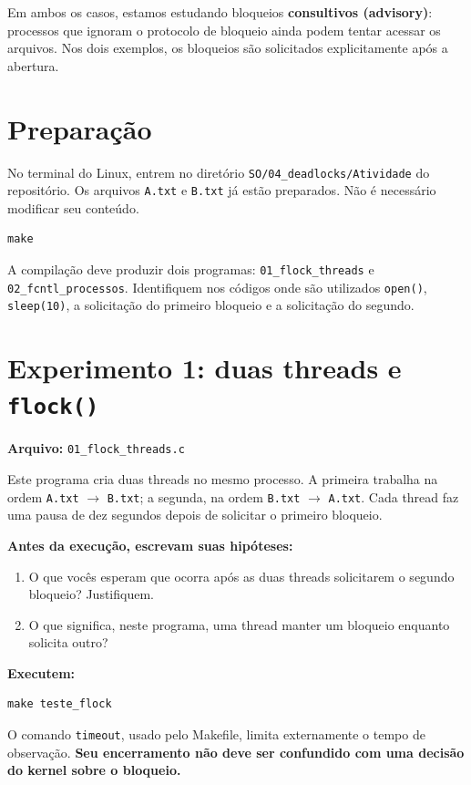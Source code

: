 \documentclass[11pt,a4paper]{article}
\begin{document}
Em ambos os casos, estamos estudando bloqueios \textbf{consultivos (advisory)}: processos que ignoram o protocolo de bloqueio ainda podem tentar acessar os arquivos. Nos dois exemplos, os bloqueios são solicitados explicitamente após a abertura.

\section{Preparação}
No terminal do Linux, entrem no diretório \texttt{SO/04\_deadlocks/Atividade} do repositório. Os arquivos \texttt{A.txt} e \texttt{B.txt} já estão preparados. Não é necessário modificar seu conteúdo.
\begin{lstlisting}[style=terminal]
make
\end{lstlisting}
A compilação deve produzir dois programas: \texttt{01\_flock\_threads} e \texttt{02\_fcntl\_processos}. Identifiquem nos códigos onde são utilizados \texttt{open()}, \texttt{sleep(10)}, a solicitação do primeiro bloqueio e a solicitação do segundo.

\newpage
\section{Experimento 1: duas threads e \texttt{flock()}}
\textbf{Arquivo:} \texttt{01\_flock\_threads.c}

Este programa cria duas threads no mesmo processo. A primeira trabalha na ordem \texttt{A.txt} $\rightarrow$ \texttt{B.txt}; a segunda, na ordem \texttt{B.txt} $\rightarrow$ \texttt{A.txt}. Cada thread faz uma pausa de dez segundos depois de solicitar o primeiro bloqueio.

\textbf{Antes da execução, escrevam suas hipóteses:}
\begin{enumerate}[label=H\arabic*.]
\item O que vocês esperam que ocorra após as duas threads solicitarem o segundo bloqueio? Justifiquem.
\item O que significa, neste programa, uma thread manter um bloqueio enquanto solicita outro?
\end{enumerate}

\textbf{Executem:}
\begin{lstlisting}[style=terminal]
make teste_flock
\end{lstlisting}
O comando \texttt{timeout}, usado pelo Makefile, limita externamente o tempo de observação. \textbf{Seu encerramento não deve ser confundido com uma decisão do kernel sobre o bloqueio.}
\end{document}
